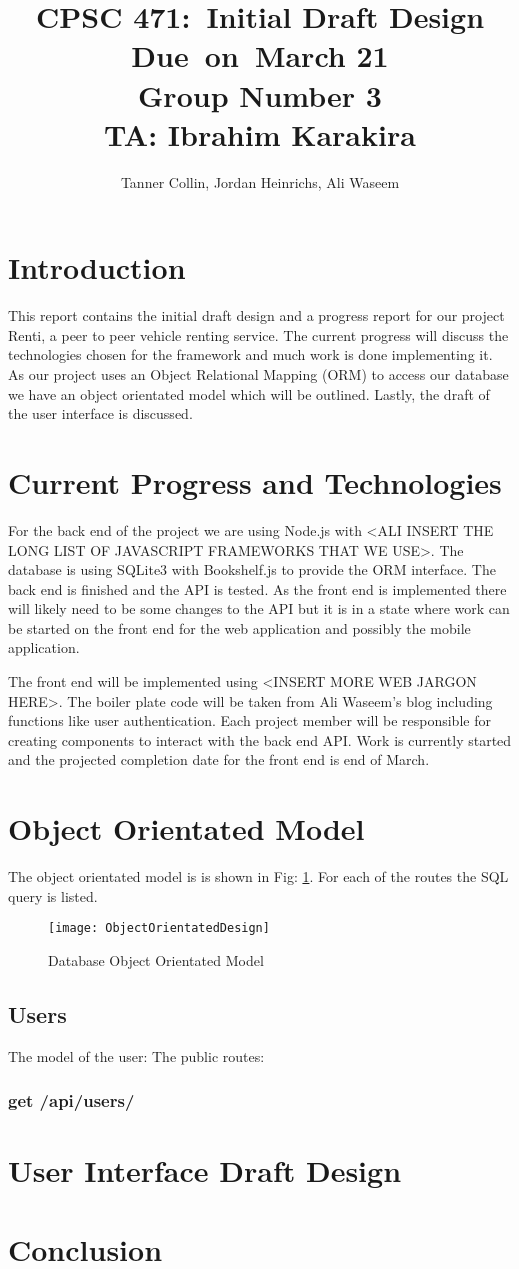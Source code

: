 \documentclass{article}
\title{
\vspace{2in}
\textmd{\textbf{CPSC 471:\ Initial Draft Design}}\\
\normalsize\vspace{0.1in}\small{Due\ on\ March 21 \\ Group Number 3 \\ TA: Ibrahim Karakira}\\
\vspace{3in}
}
\author{Tanner Collin, Jordan Heinrichs, Ali Waseem}
\date{}
\begin{document}
\maketitle
\newpage

\section{Introduction}
This report contains the initial draft design and a progress report for our project Renti, a peer to peer vehicle renting service. The current progress will discuss the
technologies chosen for the framework and much work is done implementing it. As our project uses an Object Relational Mapping (ORM) to access our database we have an
object orientated model which will be outlined. Lastly, the draft of the user interface is discussed. %

\section{Current Progress and Technologies}
For the back end of the project we are using Node.js with <ALI INSERT THE LONG LIST OF JAVASCRIPT FRAMEWORKS THAT WE USE>. The database is using SQLite3 with Bookshelf.js to provide the ORM interface.
The back end is finished and the API is tested. As the front end is implemented there will likely need to be some changes to the API but it is in a state where work can be started on the front end
for the web application and possibly the mobile application.

The front end will be implemented using <INSERT MORE WEB JARGON HERE>.
The boiler plate code will be taken from Ali Waseem's blog including functions like user authentication. %
Each project member will be responsible for creating components to interact with the back end API.
Work is currently started and the projected completion date for the front end is end of March.

\section{Object Orientated Model}
The object orientated model is is shown in Fig: \ref{fig:oomodel}. For each of the
routes the SQL query is listed.
\begin{figure}[ht!]
    \texttt{[image: ObjectOrientatedDesign]}
    \caption{Database Object Orientated Model}
    \centering
    \label{fig:oomodel}
\end{figure}
\subsection{Users}
The model of the user:
The public routes:
\subsubsection{get /api/users/}


\section{User Interface Draft Design} %

\section{Conclusion}
\end{document}
